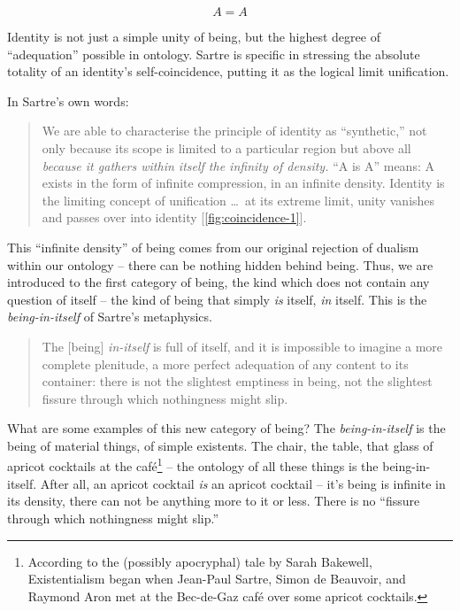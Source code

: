 \begin{equation}
    A = A
\end{equation}

\noindent
Identity is not just a simple unity of being, but the highest degree of \enquote{adequation} possible in ontology. Sartre is specific in stressing the absolute totality of an identity's self-coincidence, putting it as the logical limit unification.



\noindent
In Sartre's own words:

\blockcquote[123]{Sartre}{%
    We are able to characterise the principle of identity as \enquote{synthetic,} not only because its scope is limited to a particular region but above all \emph{because it gathers within itself the infinity of density.} \enquote{A is A} means: A exists in the form of infinite compression, in an infinite density. Identity is the limiting concept of unification \ldots\ at its extreme limit, unity vanishes and passes over into identity [\autoref{fig:coincidence-1}].
}

\noindent
This \enquote{infinite density} of being comes from our original rejection of dualism within our ontology -- there can be nothing hidden behind being.  Thus, we are introduced to the first category of being, the kind which does not contain any question of itself -- the kind of being that simply \emph{is} itself, \emph{in} itself. This is the \emph{being-in-itself} of Sartre's metaphysics. 

\blockcquote[123]{Sartre}{%
    The [being] \emph{in-itself} is full of itself, and it is impossible to imagine a more complete plenitude, a more perfect adequation of any content to its container: there is not the slightest emptiness in being, not the slightest fissure through which nothingness might slip.
}


\noindent
What are some examples of this new category of being? The \emph{being-in-itself} is the being of material things, of simple existents. The chair, the table, that glass of apricot cocktails at the café\footnote{According to the (possibly apocryphal) tale by Sarah Bakewell, Existentialism began when Jean-Paul Sartre, Simon de Beauvoir, and Raymond Aron met at the Bec-de-Gaz café over some apricot cocktails.} -- the ontology of all these things is the being-in-itself. After all, an apricot cocktail \emph{is} an apricot cocktail -- it's being is infinite in its density, there can not be anything more to it or less. There is no \enquote{fissure through which nothingness might slip.}

